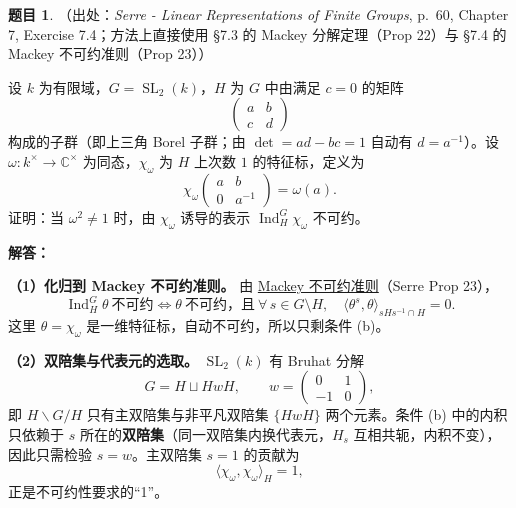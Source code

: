 \documentclass[a4paper]{ctexart}
\theoremstyle{definition}
\newtheorem{example}{题目}[section]
\theoremstyle{analysis}
\theoremstyle{plain}
\begin{document}
\begin{example}
（出处：\textit{Serre - Linear Representations of Finite Groups}, p.~60, Chapter 7, Exercise 7.4；方法上直接使用 \S7.3 的 Mackey 分解定理（Prop 22）与 \S7.4 的 Mackey 不可约准则（Prop 23））

设 \(k\) 为有限域，\(G=\operatorname{SL}_2(k)\)，\(H\) 为 \(G\) 中由满足 \(c=0\) 的矩阵
\[
  \begin{pmatrix} a & b \\ c & d \end{pmatrix}
\]
构成的子群（即上三角 Borel 子群；由 \(\det=ad-bc=1\) 自动有 \(d=a^{-1}\)）。设 \(\omega\colon k^\times\to\mathbb C^\times\) 为同态，\(\chi_\omega\) 为 \(H\) 上次数 \(1\) 的特征标，定义为
\[
  \chi_\omega\begin{pmatrix} a & b \\ 0 & a^{-1} \end{pmatrix}=\omega(a).
\]
证明：当 \(\omega^2\neq 1\) 时，由 \(\chi_\omega\) 诱导的表示 \(\operatorname{Ind}_H^G\chi_\omega\) 不可约。

\textbf{解答：}

\textbf{（1）化归到 Mackey 不可约准则。} 由 \hyperref[subsec:mackey-decomposition]{Mackey 不可约准则}（Serre Prop 23），
\[
  \operatorname{Ind}_H^G\theta\ \text{不可约}
  \iff
  \theta\ \text{不可约，且}\ \forall\, s\in G\setminus H,\quad
  \langle\theta^s,\theta\rangle_{sHs^{-1}\cap H}=0.
\]
这里 \(\theta=\chi_\omega\) 是一维特征标，自动不可约，所以只剩条件 (b)。

\textbf{（2）双陪集与代表元的选取。} \(\operatorname{SL}_2(k)\) 有 Bruhat 分解
\[
  G=H\sqcup HwH,\qquad w=\begin{pmatrix} 0 & 1 \\ -1 & 0 \end{pmatrix},
\]
即 \(H\backslash G/H\) 只有主双陪集与非平凡双陪集 \(\{HwH\}\) 两个元素。条件 (b) 中的内积只依赖于 \(s\) 所在的\textbf{双陪集}（同一双陪集内换代表元，\(H_s\) 互相共轭，内积不变），因此只需检验 \(s=w\)。主双陪集 \(s=1\) 的贡献为
\[
  \langle\chi_\omega,\chi_\omega\rangle_H=1,
\]
正是不可约性要求的“1”。


\end{example}
\end{document}
